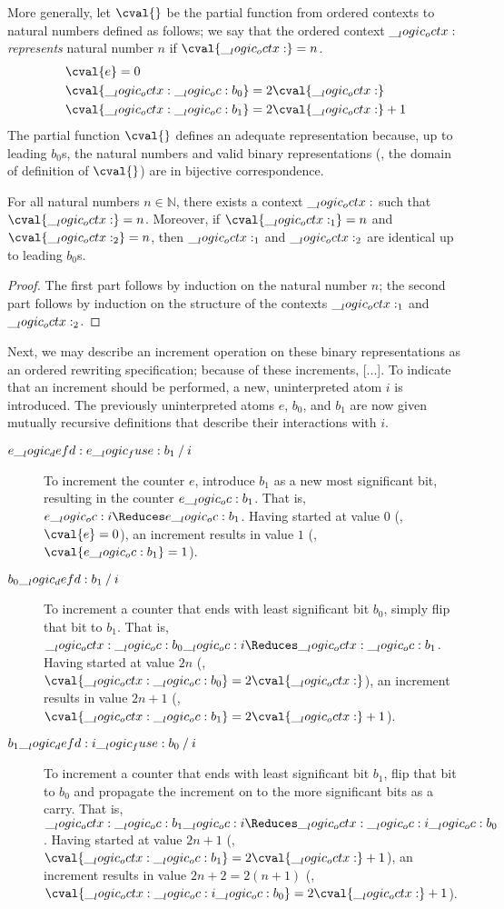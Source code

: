 More generally, let $\cval{}$ be the partial function from ordered contexts to natural numbers defined as follows; we say that the ordered context $\__logic_octx:$ \emph{represents} natural number $n$ if $\cval{\octx} = n$.
\begin{equation*}
  \begin{lgathered}
    \cval{e} = 0 \\
    \cval{\octx \oc b_0} = 2\cval{\octx} \\
    \cval{\octx \oc b_1} = 2\cval{\octx} + 1
  \end{lgathered}
\end{equation*}
The partial function \(\cval{}\) defines an adequate representation because, up to leading $b_0$s, the natural numbers and valid binary representations (\ie, the domain of definition of $\cval{}$) are in bijective correspondence.
%
\begin{theorem}
  For all natural numbers \(n \in \mathbb{N}\), there exists a context \(\__logic_octx:\) such that \(\cval{\octx} = n\).
  Moreover, if \(\cval{\octx_1} = n\) and \(\cval{\octx_2} = n\), then \(\__logic_octx:_1\) and \(\__logic_octx:_2\) are identical up to leading \(b_0\)s.
\end{theorem}
\begin{proof}
  The first part follows by induction on the natural number \(n\); the second part follows by induction on the structure of the contexts \(\__logic_octx:_1\) and \(\__logic_octx:_2\).
\end{proof}

Next, we may describe an increment operation on these binary representations as an ordered rewriting specification; because of these increments, [...].
To indicate that an increment should be performed, a new, uninterpreted atom $i$ is introduced.
The previously uninterpreted atoms $e$, $b_0$, and $b_1$ are now given mutually recursive definitions that describe their interactions with $i$.
\begin{description}
\item[$e \__logic_defd: e \__logic_fuse: b_1 \mathbin { / } i$]
  To increment the counter $e$, introduce $b_1$ as a new most significant bit, resulting in the counter $e \__logic_oc: b_1$.
  That is, $e \oc i \Reduces e \oc b_1$.
  Having started at value $0$ (\ie, $\cval{e} = 0$), an increment results in value $1$ (\ie, $\cval{e \oc b_1} = 1$).
\item[$b_0 \__logic_defd: b_1 \mathbin { / } i$]
  To increment a counter that ends with least significant bit $b_0$, simply flip that bit to $b_1$.
  That is, $\octx \oc b_0 \oc i \Reduces \octx \oc b_1$.
  Having started at value $2n$ (\ie, $\cval{\octx \oc b_0} = 2\cval{\octx}$), an increment results in value $2n+1$ (\ie, $\cval{\octx \oc b_1} = 2\cval{\octx}+1$).
\item[$b_1 \__logic_defd: i \__logic_fuse: b_0 \mathbin { / } i$]
  To increment a counter that ends with least significant bit $b_1$, flip that bit to $b_0$ and propagate the increment on to the more significant bits as a carry.
  That is, $\octx \oc b_1 \oc i \Reduces \octx \oc i \oc b_0$.
  Having started at value $2n+1$ (\ie, $\cval{\octx \oc b_1} = 2\cval{\octx}+1$), an increment results in value $2n+2 = 2(n+1)$ (\ie, $\cval{\octx \oc i \oc b_0} = 2\cval{\octx}+1$).
\end{description}

